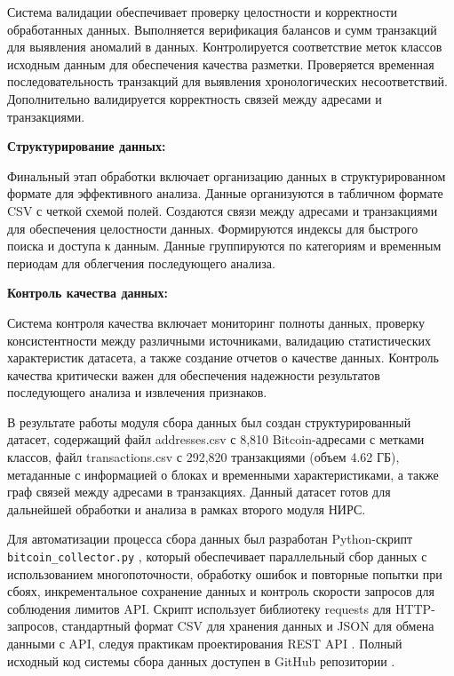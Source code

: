 Система валидации обеспечивает проверку целостности и корректности обработанных данных. Выполняется верификация балансов и сумм транзакций для выявления аномалий в данных. Контролируется соответствие меток классов исходным данным для обеспечения качества разметки. Проверяется временная последовательность транзакций для выявления хронологических несоответствий. Дополнительно валидируется корректность связей между адресами и транзакциями.

\textbf{Структурирование данных:}

Финальный этап обработки включает организацию данных в структурированном формате для эффективного анализа. Данные организуются в табличном формате CSV с четкой схемой полей. Создаются связи между адресами и транзакциями для обеспечения целостности данных. Формируются индексы для быстрого поиска и доступа к данным. Данные группируются по категориям и временным периодам для облегчения последующего анализа.

\textbf{Контроль качества данных:}

Система контроля качества включает мониторинг полноты данных, проверку консистентности между различными источниками, валидацию статистических характеристик датасета, а также создание отчетов о качестве данных. Контроль качества критически важен для обеспечения надежности результатов последующего анализа и извлечения признаков.

В результате работы модуля сбора данных был создан структурированный датасет, содержащий файл addresses.csv с 8,810 Bitcoin-адресами с метками классов, файл transactions.csv с 292,820 транзакциями (объем 4.62 ГБ), метаданные с информацией о блоках и временными характеристиками, а также граф связей между адресами в транзакциях. Данный датасет готов для дальнейшей обработки и анализа в рамках второго модуля НИРС.

Для автоматизации процесса сбора данных был разработан Python-скрипт \texttt{bitcoin\_collector.py} \cite{python_handbook}, который обеспечивает параллельный сбор данных с использованием многопоточности, обработку ошибок и повторные попытки при сбоях, инкрементальное сохранение данных и контроль скорости запросов для соблюдения лимитов API. Скрипт использует библиотеку requests \cite{requests_library} для HTTP-запросов, стандартный формат CSV \cite{csv_standard} для хранения данных и JSON \cite{json_standard} для обмена данными с API, следуя практикам проектирования REST API \cite{api_design}. Полный исходный код системы сбора данных доступен в GitHub репозитории \cite{github_repo}.

